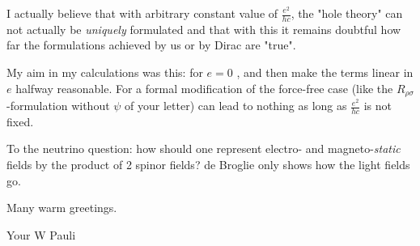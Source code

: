 \documentclass{article}
\begin{document}
I actually believe that with arbitrary constant value of $\frac{e^2}{hc}$, the "hole theory" can not actually be \textit{uniquely} formulated and that with this it remains doubtful how far the formulations achieved by us or by Dirac are "true".

My aim in my calculations was this: for $e=0$ , and then make the terms linear in $e$ halfway reasonable. For a formal modification of the force-free case (like the $R_{\rho\sigma}$-formulation without $\psi$ of your letter) can lead to nothing as long as $\frac{e^2}{hc}$ is not fixed.

To the neutrino question: how should one represent electro- and magneto-\textit{static} fields by the product of 2 spinor fields? de Broglie only shows how the light fields go.

Many warm greetings.

Your W Pauli
\end{document}
